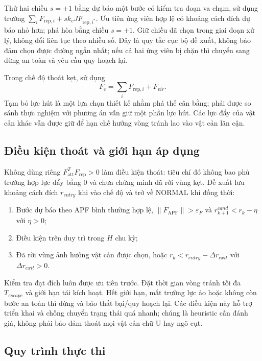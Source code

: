 \documentclass[12pt,a4paper,oneside]{report}
\numberwithin{equation}{chapter}
\newcommand{\norm}[1]{\left\lVert #1\right\rVert}
\newcommand{\att}{\mathrm{att}}
\newcommand{\rep}{\mathrm{rep}}
\begin{document}
Thử hai chiều $s=\pm1$ bằng dự báo một bước có kiểm tra đoạn va chạm, sử dụng trường $\sum_iF_{\rep,i}+s k_vJF_{\rep,i^*}$. Ưu tiên ứng viên hợp lệ có khoảng cách đích dự báo nhỏ hơn; phá hòa bằng chiều $s=+1$. Giữ chiều đã chọn trong giai đoạn xử lý, không đổi liên tục theo nhiễu số. Đây là quy tắc cục bộ đề xuất, không bảo đảm chọn được đường ngắn nhất; nếu cả hai ứng viên bị chặn thì chuyển sang dừng an toàn và yêu cầu quy hoạch lại.

Trong chế độ thoát kẹt, sử dụng
\begin{equation}
F_c=\sum_iF_{\rep,i}+F_{vir}.
\end{equation}
Tạm bỏ lực hút là một lựa chọn thiết kế nhằm phá thế cân bằng; phải được so sánh thực nghiệm với phương án vẫn giữ một phần lực hút. Các lực đẩy của vật cản khác vẫn được giữ để hạn chế hướng vòng tránh lao vào vật cản lân cận.

\subsection{Điều kiện thoát và giới hạn áp dụng}

Không dùng riêng $F_{\att}^TF_{\rep}>0$ làm điều kiện thoát: tiêu chí đó không bao phủ trường hợp lực đẩy bằng 0 và chưa chứng minh đã rời vùng kẹt. Đề xuất lưu khoảng cách đích $r_{entry}$ khi vào chế độ và trở về $\mathrm{NORMAL}$ khi đồng thời:
\begin{enumerate}
\item Bước dự báo theo APF bình thường hợp lệ, $\norm{F_{\mathrm{APF}}}>\varepsilon_F$ và $r_{k+1}^{cand}<r_k-\eta$ với $\eta>0$;
\item Điều kiện trên duy trì trong $H$ chu kỳ;
\item Đã rời vùng ảnh hưởng vật cản được chọn, hoặc $r_k<r_{entry}-\Delta r_{exit}$ với $\Delta r_{exit}>0$.
\end{enumerate}
Kiểm tra đạt đích luôn được ưu tiên trước. Đặt thời gian vòng tránh tối đa $T_{escape}$ và giới hạn tái kích hoạt. Hết giới hạn, mất trường lực ảo hoặc không còn bước an toàn thì dừng và báo thất bại/quy hoạch lại. Các điều kiện này hỗ trợ triển khai và chống chuyển trạng thái quá nhanh; chúng là heuristic cần đánh giá, không phải bảo đảm thoát mọi vật cản chữ U hay ngõ cụt.

\subsection{Quy trình thực thi}
\end{document}
